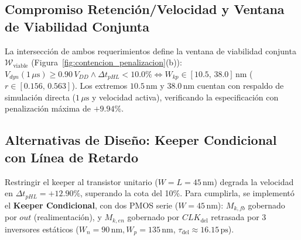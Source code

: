 \subsection{Compromiso Retención/Velocidad y Ventana de Viabilidad Conjunta}
La intersección de ambos requerimientos define la ventana de viabilidad conjunta $\mathcal{W}_{\text{viable}}$ (Figura~\ref{fig:contencion_penalizacion}(b)): $V_{dyn}(1\,\mu\text{s}) \ge 0.90\,V_{DD} \land \Delta t_{pHL} < 10.0\% \iff W_{kp} \in [10.5,\, 38.0]\,\text{nm}$ ($r \in [0.156,\, 0.563]$). Los extremos $10.5\,\text{nm}$ y $38.0\,\text{nm}$ cuentan con respaldo de simulación directa ($1\,\mu\text{s}$ y velocidad activa), verificando la especificación con penalización máxima de $+9.94\%$.

\subsection{Alternativas de Diseño: Keeper Condicional con Línea de Retardo}
Restringir el keeper al transistor unitario ($W = L = 45\,\text{nm}$) degrada la velocidad en $\Delta t_{pHL} = \mathbf{+12.90\%}$, superando la cota del 10\%. Para cumplirla, se implementó el \textbf{Keeper Condicional}, con dos PMOS serie ($W = 45\,\text{nm}$): $M_{k,fb}$ gobernado por $out$ (realimentación), y $M_{k,en}$ gobernado por $CLK_{\text{del}}$ retrasada por 3 inversores estáticos ($W_n = 90\,\text{nm}, W_p = 135\,\text{nm}$, $\tau_{\text{del}} \approx 16.15\,\text{ps}$).

